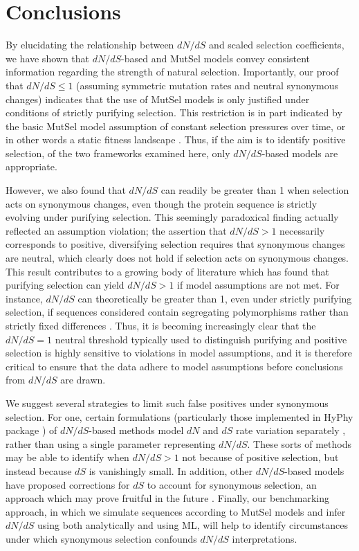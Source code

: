 \documentclass[11pt]{article}
\begin{document}
\section*{Conclusions}
By elucidating the relationship between $dN/dS$ and scaled selection coefficients, we have shown that $dN/dS$-based and MutSel models convey consistent information regarding the strength of natural selection. Importantly, our proof that $dN/dS \leq 1$ (assuming symmetric mutation rates and neutral synonymous changes) indicates that the use of MutSel models is only justified under conditions of strictly purifying selection. This restriction is in part indicated by the basic MutSel model assumption of constant selection pressures over time, or in other words a static fitness landscape \cite{HalpernBruno1998,Thorneetal2007,Rodrigueetal2010,Thorne2012}. Thus, if the aim is to identify positive selection, of the two frameworks examined here, only $dN/dS$-based models are appropriate. 


However, we also found that $dN/dS$ can readily be greater than 1 when selection acts on synonymous changes, even though the protein sequence is strictly evolving under purifying selection. This seemingly paradoxical finding actually reflected an assumption violation; the assertion that $dN/dS > 1$ necessarily corresponds to positive, diversifying selection requires that synonymous changes are neutral, which clearly does not hold if selection acts on synonymous changes. This result contributes to a growing body of literature which has found that purifying selection can yield $dN/dS > 1$ if model assumptions are not met. For instance, $dN/dS$ can theoretically be greater than 1, even under strictly purifying selection, if sequences considered contain segregating polymorphisms rather than strictly fixed differences \cite{Rochaetal2006,KryazhimskiyPlotkin2008,Mugaletal2014}. Thus, it is becoming increasingly clear that the $dN/dS = 1$ neutral threshold typically used to distinguish purifying and positive selection is highly sensitive to violations in model assumptions, and it is therefore critical to ensure that the  data adhere to model assumptions before conclusions from $dN/dS$ are drawn.

We suggest several strategies to limit such false positives under synonymous selection. For one, certain formulations (particularly those implemented in HyPhy package \cite{KosakovskyPondetal2005}) of $dN/dS$-based methods model $dN$ and $dS$ rate variation separately \cite{MuseGaut1994,KosakovskyPondMuse2005,Murrell2013}, rather than using a single parameter representing $dN/dS$. These sorts of methods may be able to identify when $dN/dS > 1$ not because of positive selection, but instead because $dS$ is vanishingly small. In addition, other $dN/dS$-based models have proposed corrections for $dS$ to account for synonymous selection, an approach which may prove fruitful in the future \cite{Zhouetal2010}. Finally, our benchmarking approach, in which we simulate sequences according to MutSel models and infer $dN/dS$ using both analytically and using ML, will help to identify circumstances under which synonymous selection confounds $dN/dS$ interpretations. 
\end{document}
